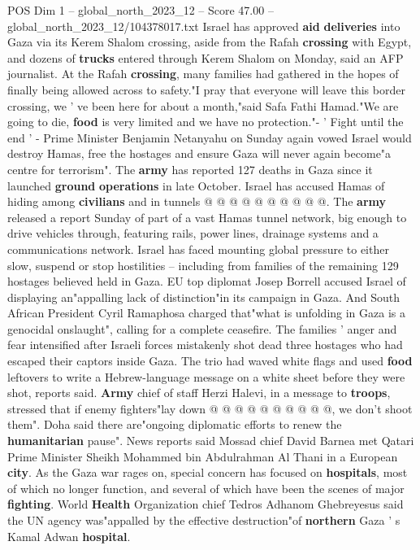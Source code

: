 \begin{textsample}{POS Dim 1 – global\_north\_2023\_12 – Score 47.00 – global\_north\_2023\_12/104378017.txt}
Israel has approved \textbf{aid} \textbf{deliveries} into Gaza via its Kerem Shalom crossing, aside from the Rafah \textbf{crossing} with Egypt, and dozens of \textbf{trucks} entered through Kerem Shalom on Monday, said an AFP journalist.
At the Rafah \textbf{crossing}, many families had gathered in the hopes of finally being allowed across to safety."I pray that everyone will leave this border crossing, we ' ve been here for about a month,"said Safa Fathi Hamad."We are going to die, \textbf{food} is very limited and we have no protection."- ' Fight until the end ' - Prime Minister Benjamin Netanyahu on Sunday again vowed Israel would destroy Hamas, free the hostages and ensure Gaza will never again become"a centre for terrorism".
The \textbf{army} has reported 127 deaths in Gaza since it launched \textbf{ground} \textbf{operations} in late October.
Israel has accused Hamas of hiding among \textbf{civilians} and in tunnels @ @ @ @ @ @ @ @ @ @.
The \textbf{army} released a report Sunday of part of a vast Hamas tunnel network, big enough to drive vehicles through, featuring rails, power lines, drainage systems and a communications network.
Israel has faced mounting global pressure to either slow, suspend or stop hostilities -- including from families of the remaining 129 hostages believed held in Gaza.
EU top diplomat Josep Borrell accused Israel of displaying an"appalling lack of distinction"in its campaign in Gaza.
And South African President Cyril Ramaphosa charged that"what is unfolding in Gaza is a genocidal onslaught", calling for a complete ceasefire.
The families ' anger and fear intensified after Israeli forces mistakenly shot dead three hostages who had escaped their captors inside Gaza.
The trio had waved white flags and used \textbf{food} leftovers to write a Hebrew-language message on a white sheet before they were shot, reports said. \textbf{Army} chief of staff Herzi Halevi, in a message to \textbf{troops}, stressed that if enemy fighters"lay down @ @ @ @ @ @ @ @ @ @, we don't shoot them".
Doha said there are"ongoing diplomatic efforts to renew the \textbf{humanitarian} pause".
News reports said Mossad chief David Barnea met Qatari Prime Minister Sheikh Mohammed bin Abdulrahman Al Thani in a European \textbf{city}.
As the Gaza war rages on, special concern has focused on \textbf{hospitals}, most of which no longer function, and several of which have been the scenes of major \textbf{fighting}.
World \textbf{Health} Organization chief Tedros Adhanom Ghebreyesus said the UN agency was"appalled by the effective destruction"of \textbf{northern} Gaza ' s Kamal Adwan \textbf{hospital}.

\end{textsample}
